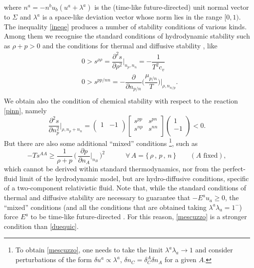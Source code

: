 \documentclass[a4paper, amsfonts, amssymb, amsmath, reprint, showkeys, nofootinbib, twoside, onecolumn,notitlepage]{revtex4-1}
\newcommand{\spc}{\quad \quad \quad}
\begin{document}
where $n^a =-n^b u_b(u^a+\lambda^a)$ is the (time-like future-directed) unit normal vector to $\Sigma$ and $\lambda^a$ is a space-like
deviation vector whose norm lies in the range $[0,1)$. The inequality \eqref{ineqe} produces a number of stability conditions of various kinds. Among them we recognise the standard conditions of hydrodynamic stability such as $\rho+p>0$ and the conditions for thermal and diffusive stability \cite{PrigoginebookModernThermodynamics2014}, like
\begin{equation}\label{duequic}
\begin{split}
& 0> s^{\rho \rho} =\dfrac{\partial^2 s}{\partial \rho^2} \bigg|_{n_p,n_n} = - \dfrac{1}{T^2 c_v} \\
& 0>  s^{pp/nn} = - \dfrac{\partial}{\partial n_{p/n}}  \bigg( \dfrac{\mu_{p/n}}{T} \bigg) \bigg|_{\rho,n_{n/p}} . \\
\end{split}
\end{equation}
We obtain also the condition of chemical stability with respect to the reaction \eqref{pinn}, namely
\begin{equation}\label{chemicstab}
\dfrac{\partial^2 s}{\partial n_p^2} \bigg|_{\rho,n_p+n_n} =
\begin{pmatrix}
 1 &  -1 \\
\end{pmatrix} 
\begin{bmatrix}
   s^{pp} & s^{pn}  \\
   s^{np} & s^{nn}  \\
\end{bmatrix} 
\begin{pmatrix}
1   \\
-1 \\
\end{pmatrix}
<0.
\end{equation}
But there are also some additional ``mixed'' conditions \footnote{To obtain \eqref{mescuzzo}, one needs to take the limit $\lambda^a \lambda_a \rightarrow 1$ and consider perturbations of the form $\delta u^a \propto \lambda^a$, $\delta n_C = \delta^A_C \delta n_A$ for a given $A$.}, such as
\begin{equation}\label{mescuzzo}
-T s^{AA} \geq \dfrac{1}{\rho + p} \, \bigg( \, \dfrac{\partial p}{\partial n_A} \bigg|_{n_B} \, \bigg)^2 \spc \forall \, A=\{ \, \rho \,, \, p \, , \,n \, \} \quad \quad (A \text{ fixed}),
\end{equation}
which cannot be derived within standard thermodynamics, nor from the perfect-fluid limit of the hydrodynamic model, but are hydro-diffusive conditions, specific of a two-component relativistic fluid. Note that, while the standard conditions of thermal and diffusive stability are necessary to guarantee that $-E^au_a \geq 0$, the ``mixed'' conditions (and all the conditions that are obtained taking $\lambda^a \lambda_a =1^-$) force $E^a$ to be time-like future-directed \cite{GavassinoCausality2021}. For this reason, \eqref{mescuzzo} is a stronger condition than \eqref{duequic}.  
\end{document}
